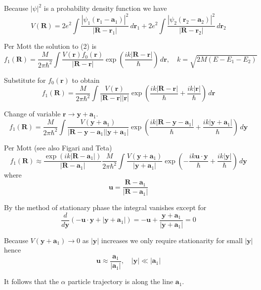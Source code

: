 \documentclass[12pt]{article}
\begin{document}
Because $|\psi|^2$ is a probability density function we have
\begin{equation*}
V(\mathbf R)
=2e^2\int\frac{|\psi_1(\mathbf r_1-\mathbf a_1)|^2}{|\mathbf R-\mathbf r_1|}
\,d\mathbf r_1
+2e^2\int\frac{|\psi_2(\mathbf r_2-\mathbf a_2)|^2}{|\mathbf R-\mathbf r_2|}
\,d\mathbf r_2
\end{equation*}

Per Mott the solution to (2) is
\begin{equation*}
f_1(\mathbf R)=
\frac{M}{2\pi\hbar^2}\int\frac{V(\mathbf r)f_0(\mathbf r)}{|\mathbf R-\mathbf r|}
\exp\left(\frac{ik|\mathbf R-\mathbf r|}{\hbar}\right)\,d\mathbf r,
\quad
k=\sqrt{2M(E-E_1-E_2)}
\end{equation*}

Substitute for $f_0(\mathbf r)$ to obtain
\begin{equation*}
f_1(\mathbf R)=
\frac{M}{2\pi\hbar^2}\int\frac{V(\mathbf r)}{|\mathbf R-\mathbf r||\mathbf r|}
\exp\left(\frac{ik|\mathbf R-\mathbf r|}{\hbar}+\frac{ik|\mathbf r|}{\hbar}\right)\,d\mathbf r
\end{equation*}

Change of variable $\mathbf r\rightarrow\mathbf y+\mathbf a_1$.
\begin{equation*}
f_1(\mathbf R)=
\frac{M}{2\pi\hbar^2}\int
\frac{V(\mathbf y+\mathbf a_1)}{|\mathbf R-\mathbf y-\mathbf a_1||\mathbf y+\mathbf a_1|}
\exp\left(\frac{ik|\mathbf R-\mathbf y-\mathbf a_1|}{\hbar}
+\frac{ik|\mathbf y+\mathbf a_1|}{\hbar}\right)\,d\mathbf y
\end{equation*}

Per Mott (see also Figari and Teta)
\begin{equation*}
f_1(\mathbf R)\approx
\frac{\exp(ik|\mathbf R-\mathbf a_1|)}{|\mathbf R-\mathbf a_1|}
\frac{M}{2\pi\hbar^2}\int\frac{V(\mathbf y+\mathbf a_1)}{|\mathbf y+\mathbf a_1|}
\exp\left(-\frac{ik\mathbf u\cdot\mathbf y}{\hbar}+\frac{ik|\mathbf y|}{\hbar}\right)\,d\mathbf y
\tag{3}
\end{equation*}
where
\begin{equation*}
\mathbf u=\frac{\mathbf R-\mathbf a_1}{|\mathbf R-\mathbf a_1|}
\end{equation*}

By the method of stationary phase the integral vanishes except for
\begin{equation*}
\frac{d}{d\mathbf y}\left(-\mathbf u\cdot\mathbf y+|\mathbf y+\mathbf a_1|\right)
=-\mathbf u+\frac{\mathbf y+\mathbf a_1}{|\mathbf y+\mathbf a_1|}=0
\end{equation*}

Because $V(\mathbf y+\mathbf a_1)\rightarrow0$ as $|\mathbf y|$ increases
we only require stationarity for small $|\mathbf y|$ hence
\begin{equation*}
\mathbf u\approx\frac{\mathbf a_1}{|\mathbf a_1|},
\quad
|\mathbf y|\ll|\mathbf a_1|
\end{equation*}

It follows that the $\alpha$ particle trajectory is along the line $\mathbf a_1$.
\end{document}
